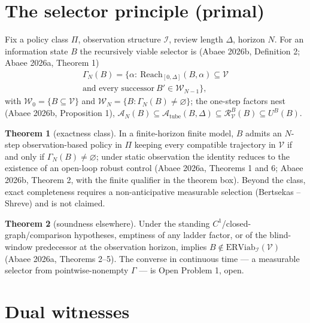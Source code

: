 \documentclass[10pt,twocolumn]{article}
\theoremstyle{definition}
\newtheorem{theorem}{Theorem}
\begin{document}
\section{The selector principle (primal)}

Fix a policy class $\Pi$, observation structure $\mathcal{I}$, review
length $\Delta$, horizon $N$. For an information state $B$ the recursively
viable selector is (Abaee 2026b, Definition 2; Abaee 2026a, Theorem 1)
\begin{gather*}
\Gamma_{N}(B) = \{\alpha:\ \mathrm{Reach}_{[0,\Delta]}(B,\alpha)
\subseteq \mathcal{V}\\
\text{and every successor}\ B' \in \mathscr{W}_{N-1}\},
\end{gather*}
with $\mathscr{W}_0 = \{B \subseteq \mathcal{V}\}$ and
$\mathscr{W}_N = \{B : \Gamma_N(B) \neq \varnothing\}$; the one-step
factors nest (Abaee 2026b, Proposition 1),
$\mathcal{A}_N(B) \subseteq \mathcal{A}_{\mathrm{tube}}(B,\Delta)
\subseteq \mathcal{R}^B_{\mathcal{V}}(B) \subseteq U^B(B)$.

\begin{theorem}[exactness class]\label{thm:A}
In a finite-horizon finite model, $B$ admits an $N$-step
observation-based policy in $\Pi$ keeping every compatible trajectory in
$\mathcal{V}$ if and only if $\Gamma_N(B) \neq \varnothing$; under static
observation the identity reduces to the existence of an open-loop robust
control (Abaee 2026a, Theorems 1 and 6; Abaee 2026b, Theorem 2, with the
finite qualifier in the theorem box). Beyond the class, exact
completeness requires a non-anticipative measurable selection
(Bertsekas -- Shreve) and is not claimed.
\end{theorem}

\begin{theorem}[soundness elsewhere]\label{thm:B}
Under the standing $C^1$/closed-graph/comparison hypotheses, emptiness of
any ladder factor, or of the blind-window predecessor at the observation
horizon, implies $B \notin \mathrm{ERViab}_{\mathcal{I}}(\mathcal{V})$
(Abaee 2026a, Theorems 2--5). The converse in continuous time --- a
measurable selector from pointwise-nonempty $\Gamma$ --- is Open
Problem 1, open.
\end{theorem}

\section{Dual witnesses}
\end{document}
